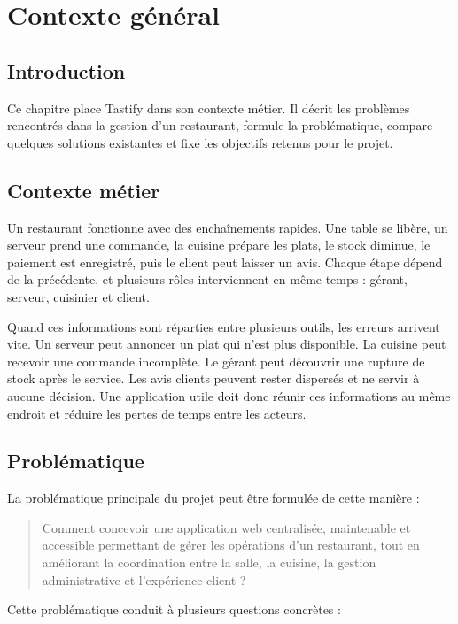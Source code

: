 \chapter{Contexte général}
\label{chap:contexte}

\section*{Introduction}
Ce chapitre place Tastify dans son contexte métier. Il décrit les problèmes rencontrés dans la gestion d'un restaurant, formule la problématique, compare quelques solutions existantes et fixe les objectifs retenus pour le projet.

\section{Contexte métier}
Un restaurant fonctionne avec des enchaînements rapides. Une table se libère, un serveur prend une commande, la cuisine prépare les plats, le stock diminue, le paiement est enregistré, puis le client peut laisser un avis. Chaque étape dépend de la précédente, et plusieurs rôles interviennent en même temps : gérant, serveur, cuisinier et client.

Quand ces informations sont réparties entre plusieurs outils, les erreurs arrivent vite. Un serveur peut annoncer un plat qui n'est plus disponible. La cuisine peut recevoir une commande incomplète. Le gérant peut découvrir une rupture de stock après le service. Les avis clients peuvent rester dispersés et ne servir à aucune décision. Une application utile doit donc réunir ces informations au même endroit et réduire les pertes de temps entre les acteurs.

\section{Problématique}
La problématique principale du projet peut être formulée de cette manière :

\begin{quote}
Comment concevoir une application web centralisée, maintenable et accessible permettant de gérer les opérations d'un restaurant, tout en améliorant la coordination entre la salle, la cuisine, la gestion administrative et l'expérience client ?
\end{quote}

Cette problématique conduit à plusieurs questions concrètes :

